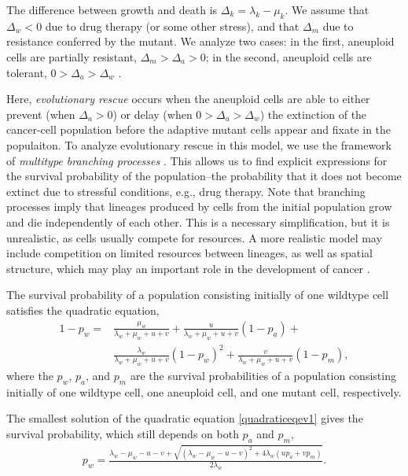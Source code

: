 \documentclass[12pt]{extarticle}
\begin{document}
The difference between growth and death is $\Delta_k = \lambda_k-\mu_k$.
We assume that $\Delta_w<0$ due to drug therapy (or some other stress), and that $\Delta_m$ due to resistance conferred by the mutant.
We analyze two cases: in the first, aneuploid cells are partially resistant, $\Delta_m>\Delta_a>0$; in the second, aneuploid cells are tolerant, $0>\Delta_a>\Delta_w$  \cite{brauner2016distinguishing}.

Here, \emph{evolutionary rescue} occurs when the aneuploid cells are able to either prevent (when $\Delta_a>0$) or delay (when $0>\Delta_a>\Delta_w$) the extinction of the cancer-cell population before the adaptive mutant cells appear and fixate in the populaiton.
To analyze evolutionary rescue in this model, we use the framework of \emph{multitype branching processes} \cite{rybnikov2021fitness,harris1963theory}. 
This allows us to find explicit expressions for the survival probability of the population--the probability that it does not become extinct due to stressful conditions, e.g., drug therapy.
Note that branching processes imply that lineages produced by cells from the initial population grow and die independently of each other.
This is a necessary simplification, but it is unrealistic, as cells usually compete for resources.
A more realistic model may include competition on limited resources between lineages, as well as spatial structure, which may play an important role in the development of cancer \cite{martens2011spatial}.

The survival probability of a population consisting initially of one wildtype cell satisfies the quadratic equation,
\begin{equation} \label{quadraticeqev1}
\begin{aligned}
1-p_w = & \frac{\mu_w}{\lambda_w+\mu_w+u+v} + 
		  \frac{u}{\lambda_w+\mu_w+u+v}\left(1-p_a\right) + \\
		  & \frac{\lambda_w}{\lambda_w+\mu_w+u+v}\left(1-p_w\right)^2 +
		  \frac{v}{\lambda_w+\mu_w+u+v}\left(1-p_m\right) ,
\end{aligned}
\end{equation}
where the $p_w$, $p_a$, and $p_m$ are the survival probabilities of a population consisting initially of one wildtype cell, one aneuploid cell, and one mutant cell, respectively.

The smallest solution of the quadratic equation \cref{quadraticeqev1} gives the survival probability, which still depends on both $p_a$ and $p_m$,
\begin{align}\label{survprobw}
p_w=\frac{\lambda_w-\mu_w-u-v+\sqrt{\left(\lambda_w-\mu_w-u-v\right)^2+4\lambda_w\left(up_a+vp_m\right)}}{2\lambda_w} .
\end{align}
\end{document}
